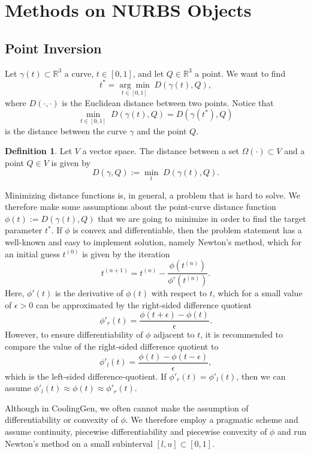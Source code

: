 \documentclass[a4paper, 11pt]{report}
\theoremstyle{definition}
\newtheorem{definition}{Definition}[section]
\begin{document}
\section{Methods on NURBS Objects}
\subsection{Point Inversion}
	Let $\gamma(t) \subset \mathbb{R}^3$ a curve, $t \in [0,1]$, and let $Q \in \mathbb{R}^3$ a point.
	We want to find
		$$t^* = \underset{t\in[0,1]}{\arg\min} \; D(\gamma(t), Q), $$
	where $D(\cdot, \cdot)$ is the Euclidean distance between two points. Notice that 
		$$\underset{t\in[0,1]}{\min} \; D(\gamma(t), Q) = D(\gamma(t^*), Q) $$
	is the distance between the curve $\gamma$ and the point $Q$.

	\begin{definition}
		Let $V$ a vector space. The distance between a set $\Omega(\cdot) \subset V$ and a point $Q \in V$ is given by
			$$D(\gamma, Q) := \underset{t}{\min} \; D(\gamma(t), Q).$$
	\end{definition}

	Minimizing distance functions is, in general, a problem that is hard to solve. We therefore make some assumptions about the point-curve distance function $\phi(t) := D(\gamma(t), Q)$ that we are going to minimize in order to find the target parameter $t^*$. If $\phi$ is convex and differentiable, then the problem statement has a well-known and easy to implement solution, namely Newton's method, which for an initial guess $t^{(0)}$ is given by the iteration
		$$ t^{(n+1)} = t^{(n)} - \frac {\phi(t^{(n)})}{\phi'(t^{(n)})}. $$
	Here, $\phi'(t)$ is the derivative of $\phi(t)$ with respect to $t$, which for a small value of $\epsilon > 0$ can be approximated by the right-sided difference quotient
		$$ \phi'_r(t) = \frac{\phi(t+\epsilon) - \phi(t)}{\epsilon}. $$
	However, to ensure differentiability of $\phi$ adjacent to $t$, it is recommended to compare the value of the right-sided difference quotient to
		$$ \phi'_l(t) = \frac{\phi(t) - \phi(t-\epsilon)}{\epsilon}, $$
	which is the left-sided difference-quotient. If $\phi'_r(t) = \phi'_l(t)$, then we can assume $\phi'_l(t) \approx \phi(t) \approx \phi'_r(t)$.

	Although in CoolingGen, we often cannot make the assumption of differentiability or convexity of $\phi$. We therefore employ a pragmatic scheme and assume continuity, piecewise differentiability and piecewise convexity of $\phi$ and run Newton's method on a small subinterval $[l,u] \subset [0,1]$.
\end{document}
